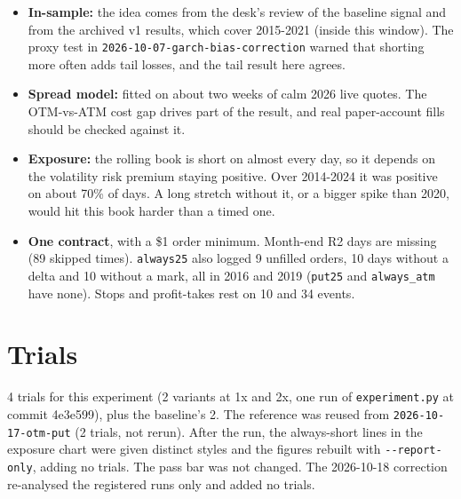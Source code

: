 \documentclass{article}
\begin{document}
\begin{itemize}

\item \textbf{In-sample:} the idea comes from the desk's review of the baseline signal and from the archived v1 results, which cover 2015-2021 (inside this window). The proxy test in \texttt{2026-\allowbreak{}10-\allowbreak{}07-\allowbreak{}garch-\allowbreak{}bias-\allowbreak{}correction} warned that shorting more often adds tail losses, and the tail result here agrees.

\item \textbf{Spread model:} fitted on about two weeks of calm 2026 live quotes. The OTM-vs-ATM cost gap drives part of the result, and real paper-account fills should be checked against it.

\item \textbf{Exposure:} the rolling book is short on almost every day, so it depends on the volatility risk premium staying positive. Over 2014-2024 it was positive on about 70\% of days. A long stretch without it, or a bigger spike than 2020, would hit this book harder than a timed one.

\item \textbf{One contract}, with a \$1 order minimum. Month-end R2 days are missing (89 skipped times). \texttt{always25} also logged 9 unfilled orders, 10 days without a delta and 10 without a mark, all in 2016 and 2019 (\texttt{put25} and \texttt{always\_\allowbreak{}atm} have none). Stops and profit-takes rest on 10 and 34 events.

\end{itemize}

\section{Trials}

4 trials for this experiment (2 variants at 1x and 2x, one run of \texttt{experiment.\allowbreak{}py} at commit 4e3e599), plus the baseline's 2. The reference was reused from \texttt{2026-\allowbreak{}10-\allowbreak{}17-\allowbreak{}otm-\allowbreak{}put} (2 trials, not rerun). After the run, the always-short lines in the exposure chart were given distinct styles and the figures rebuilt with \texttt{-\allowbreak{}-\allowbreak{}report-\allowbreak{}only}, adding no trials. The pass bar was not changed. The 2026-10-18 correction re-analysed the registered runs only and added no trials.
\end{document}
